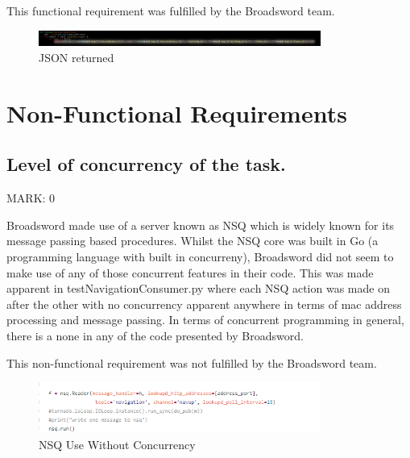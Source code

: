 \documentclass{article}
\begin{document}
\begin{flushleft}
This functional requirement was fulfilled by the Broadsword team.
\end{flushleft}

\begin{figure}[ht]
  \includegraphics[width=350px]{Images/jsonreturn.jpg}
  \caption{JSON returned}
  \label{fig:JSON returned}
\end{figure}


\section{Non-Functional Requirements}

\subsection{Level of concurrency of the task.}
\begin{flushleft}
MARK: 0
\end{flushleft}

\begin{flushleft}
Broadsword made use of a server known as NSQ which is widely known for its message passing based procedures. Whilst the NSQ core was built in Go (a programming language with built in concurreny), Broadsword did not seem to make use of any of those concurrent features in their code. This was made apparent in testNavigationConsumer.py where each NSQ action was made on after the other with no concurrency apparent anywhere in terms of mac address processing and message passing. In terms of concurrent programming in general, there is a none in any of the code presented by Broadsword. 
\end{flushleft}

\begin{flushleft}
This non-functional requirement was not fulfilled by the Broadsword team.
\end{flushleft}

\begin{figure}[ht]
  \includegraphics[width=350px]{Images/concurrency.PNG}
  \caption{NSQ Use Without Concurrency}
  \label{NSQ Use Without Concurrency}
\end{figure}
\end{document}

